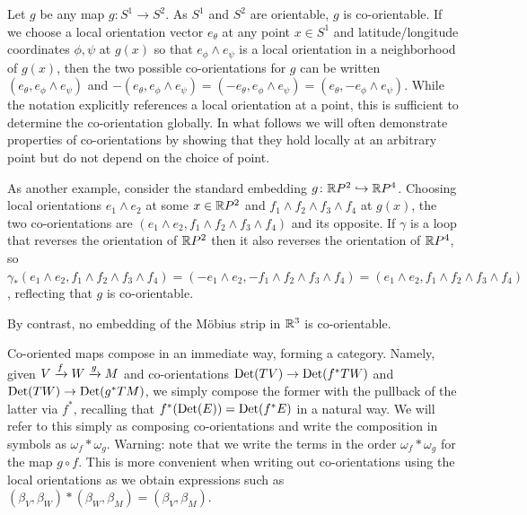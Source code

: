 \begin{example}
	Let $g$ be any map $g \colon S^1 \to S^2$.
	As $S^1$ and $S^2$ are orientable, $g$ is co-orientable.
	If we choose a local orientation vector $e_{\theta}$ at any point $x \in S^1$ and latitude/longitude coordinates $\phi,\psi$ at $g(x)$ so that $e_\phi \wedge e_\psi$ is a local orientation in a neighborhood of $g(x)$, then the two possible co-orientations for $g$ can be written $(e_\theta, e_\phi \wedge e_\psi)$ and $-(e_\theta, e_\phi \wedge e_\psi) = (-e_\theta, e_\phi \wedge e_\psi) = (e_\theta,- e_\phi \wedge e_\psi)$.
	While the notation explicitly references a local orientation at a point, this is sufficient to determine the co-orientation globally.
	In what follows we will often demonstrate properties of co-orientations by showing that they hold locally at an arbitrary point but do not depend on the choice of point.

	As another example, consider the standard embedding $g \colon \mathbb{R} P^2 \hookrightarrow \mathbb{R} P^4$.
	Choosing local orientations $e_1 \wedge e_2$ at some $x \in \mathbb{R} P^2$ and $f_1 \wedge f_2 \wedge f_3 \wedge f_4$ at $g(x)$, the two co-orientations are $(e_1 \wedge e_2, f_1 \wedge f_2 \wedge f_3 \wedge f_4)$ and its opposite.
	If $\gamma$ is a loop that reverses the orientation of $\mathbb{R} P^2$ then it also reverses the orientation of $\mathbb{R} P^4$, so $\gamma_*(e_1 \wedge e_2, f_1 \wedge f_2 \wedge f_3 \wedge f_4) = (-e_1 \wedge e_2,- f_1 \wedge f_2 \wedge f_3 \wedge f_4) = (e_1 \wedge e_2, f_1 \wedge f_2 \wedge f_3 \wedge f_4)$, reflecting that $g$ is co-orientable.

	By contrast, no embedding of the M\"obius strip in $\mathbb{R}^3$ is co-orientable.
\end{example}

\begin{remark}\label{R: cooriented composition}
	Co-oriented maps compose in an immediate way, forming a category.
	Namely, given $V \xrightarrow{f} W \xrightarrow{g} M$ and co-orientations ${\rm Det}(TV) \to {\rm Det}(f^*TW)$ and ${\rm Det}(TW) \to {\rm Det}(g^*TM)$, we simply compose the former with the pullback of the latter via $f^*$, recalling that $f^*({\rm Det}(E)) = {\rm Det}(f^*E)$ in a natural way.
	We will refer to this simply as composing co-orientations and write the composition in symbols as $\omega_f*\omega_g$.
	Warning: note that we write the terms in the order $\omega_f*\omega_g$ for the map $g \circ f$.
	This is more convenient when writing out co-orientations using the local orientations as we obtain expressions such as $(\beta_V, \beta_W)*(\beta_W,\beta_M) = (\beta_V,\beta_M)$.
\end{remark}


